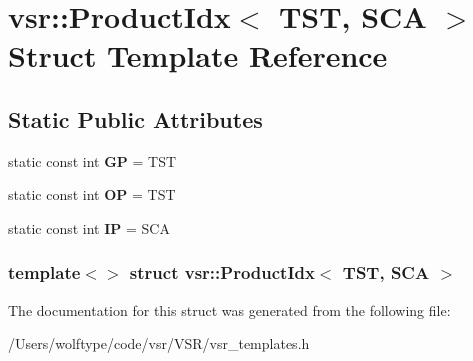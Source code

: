 \hypertarget{structvsr_1_1_product_idx_3_01_t_s_t_00_01_s_c_a_01_4}{\section{vsr\-:\-:Product\-Idx$<$ T\-S\-T, S\-C\-A $>$ Struct Template Reference}
\label{structvsr_1_1_product_idx_3_01_t_s_t_00_01_s_c_a_01_4}
}
\subsection*{Static Public Attributes}
\begin{DoxyCompactItemize}
\item 
\hypertarget{structvsr_1_1_product_idx_3_01_t_s_t_00_01_s_c_a_01_4_a4463a5695a296d0b685f44a4799490f3}{static const int {\bfseries G\-P} = T\-S\-T}\label{structvsr_1_1_product_idx_3_01_t_s_t_00_01_s_c_a_01_4_a4463a5695a296d0b685f44a4799490f3}

\item 
\hypertarget{structvsr_1_1_product_idx_3_01_t_s_t_00_01_s_c_a_01_4_ac08b0626918c5f3ecf8741df1905c82e}{static const int {\bfseries O\-P} = T\-S\-T}\label{structvsr_1_1_product_idx_3_01_t_s_t_00_01_s_c_a_01_4_ac08b0626918c5f3ecf8741df1905c82e}

\item 
\hypertarget{structvsr_1_1_product_idx_3_01_t_s_t_00_01_s_c_a_01_4_a93a722dc1224f4c2d66aec4ba3b2d7a6}{static const int {\bfseries I\-P} = S\-C\-A}\label{structvsr_1_1_product_idx_3_01_t_s_t_00_01_s_c_a_01_4_a93a722dc1224f4c2d66aec4ba3b2d7a6}

\end{DoxyCompactItemize}
\subsubsection*{template$<$$>$ struct vsr\-::\-Product\-Idx$<$ T\-S\-T, S\-C\-A $>$}



The documentation for this struct was generated from the following file\-:\begin{DoxyCompactItemize}
\item 
/\-Users/wolftype/code/vsr/\-V\-S\-R/vsr\-\_\-templates.\-h\end{DoxyCompactItemize}

